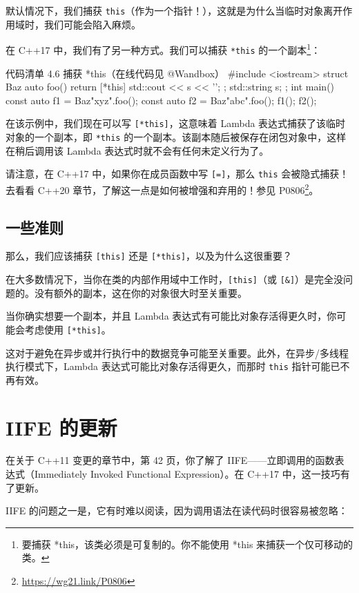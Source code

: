 默认情况下，我们捕获 \texttt{this}（作为一个指针！），这就是为什么当临时对象离开作用域时，我们可能会陷入麻烦。

在 C++17 中，我们有了另一种方式。我们可以捕获 \texttt{*this} 的一个副本\footnote{要捕获 *this，该类必须是可复制的。你不能使用 *this 来捕获一个仅可移动的类。}：

\begin{codeboxt}{代码清单 4.6 捕获 *this（在线代码见 @Wandbox）}
#include <iostream>
struct Baz {
auto foo() {
return [*this] { std::cout << s << '\n'; };
}
std::string s;
};
int main() {
const auto f1 = Baz{"xyz"}.foo();
const auto f2 = Baz{"abc"}.foo();
f1();
f2();
}
\end{codeboxt}

在该示例中，我们现在可以写 \texttt{[*this]}，这意味着 Lambda 表达式捕获了该临时对象的一个副本，即 \texttt{*this} 的一个副本。该副本随后被保存在闭包对象中，这样在稍后调用该 Lambda 表达式时就不会有任何未定义行为了。


请注意，在 C++17 中，如果你在成员函数中写 \texttt{[=]}，那么 \texttt{this} 会被隐式捕获！去看看 C++20 章节，了解这一点是如何被增强和弃用的！参见 P0806\footnote{\url{https://wg21.link/P0806}}。

\subsection{一些准则}

那么，我们应该捕获 \texttt{[this]} 还是 \texttt{[*this]}，以及为什么这很重要？

在大多数情况下，当你在类的内部作用域中工作时，\texttt{[this]}（或 \texttt{[\&]}）是完全没问题的。没有额外的副本，这在你的对象很大时至关重要。

当你确实想要一个副本，并且 Lambda 表达式有可能比对象存活得更久时，你可能会考虑使用 \texttt{[*this]}。

这对于避免在异步或并行执行中的数据竞争可能至关重要。此外，在异步/多线程执行模式下，Lambda 表达式可能比对象存活得更久，而那时 \texttt{this} 指针可能已不再有效。

\section{IIFE 的更新}

在关于 C++11 变更的章节中，第 42 页，你了解了 IIFE——立即调用的函数表达式（Immediately Invoked Functional Expression）。在 C++17 中，这一技巧有了更新。

IIFE 的问题之一是，它有时难以阅读，因为调用语法在读代码时很容易被忽略：

